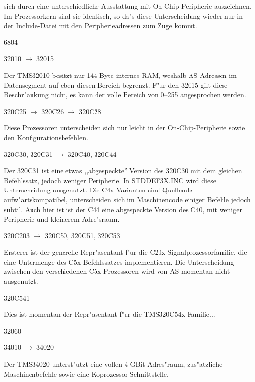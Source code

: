 \documentclass[12pt,a4paper,twoside]{report}
\newcommand{\asname}{AS}
\begin{document}
sich durch eine unterschiedliche Ausstattung mit On-Chip-Peripherie
auszeichnen.  Im Prozessorkern sind sie identisch, so da"s diese
Unterscheidung wieder nur in der Include-Datei mit den Peripherieadressen zum
Zuge kommt.
\begin{cpulist}
   6804
\end{cpulist}
\begin{cpulist}
   32010 $\rightarrow$ 32015
\end{cpulist}
Der TMS32010 besitzt nur 144 Byte internes RAM, weshalb \asname{} Adressen im
Datensegment auf eben diesen Bereich begrenzt.  F"ur den 32015 gilt diese
Beschr"ankung nicht, es kann der volle Bereich von 0--255 angesprochen
werden.
\begin{cpulist}
   320C25 $\rightarrow$ 320C26 $\rightarrow$ 320C28
\end{cpulist}
Diese Prozessoren unterscheiden sich nur leicht in der
On-Chip-Peripherie sowie den Konfigurationsbefehlen.
\begin{cpulist}
   320C30, 320C31 $\rightarrow$ 320C40, 320C44
\end{cpulist}
Der 320C31 ist eine etwas ,,abgespeckte'' Version des 320C30 mit dem
gleichen Befehlssatz, jedoch weniger Peripherie.  In STDDEF3X.INC
wird diese Unterscheidung ausgenutzt.  Die C4x-Varianten sind
Quellcode-aufw"artskompatibel, unterscheiden sich im
Maschinencode einiger Befehle jedoch subtil.  Auch hier ist ist
der C44 eine abgespeckte Version des C40, mit weniger Peripherie
und kleinerem Adre"sraum.
\begin{cpulist}
   320C203 $\rightarrow$ 320C50, 320C51, 320C53
\end{cpulist}
Ersterer ist der generelle Repr"asentant f"ur die
C20x-Signalprozessorfamilie, die eine Untermenge des C5x-Befehlssatzes
implementieren.  Die Unterscheidung zwischen den verschiedenen
C5x-Prozessoren wird von \asname{} momentan nicht ausgenutzt.
\begin{cpulist}
   320C541
\end{cpulist}
Dies ist momentan der Repr"asentant f"ur die TMS320C54x-Familie...
\begin{cpulist}
   32060
\end{cpulist}
\begin{cpulist}
   34010 $\rightarrow$ 34020
\end{cpulist}
Der TMS34020 unterst"utzt eine vollen 4 GBit-Adres"raum, zus"atzliche
Maschinenbefehle sowie eine Koprozessor-Schnittstelle.
\end{document}
